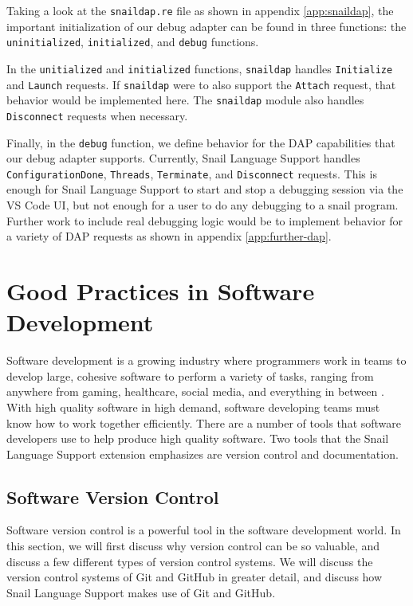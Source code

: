 \documentclass{article}
\begin{document}
Taking a look at the \lstinline{snaildap.re} file as shown in appendix \ref{app:snaildap}, the important initialization of our debug adapter can be found in three functions: the \lstinline{uninitialized}, \lstinline{initialized}, and \lstinline{debug} functions. 

In the \lstinline{unitialized} and \lstinline{initialized} functions, \lstinline{snaildap} handles \lstinline{Initialize} and \lstinline{Launch} requests. If \lstinline{snaildap} were to also support the \lstinline{Attach} request, that behavior would be implemented here. The \lstinline{snaildap} module also handles \lstinline{Disconnect} requests when necessary. 

Finally, in the \lstinline{debug} function, we define behavior for the DAP capabilities that our debug adapter supports. Currently, Snail Language Support handles \lstinline{ConfigurationDone}, \lstinline{Threads}, \lstinline{Terminate}, and \lstinline{Disconnect} requests. This is enough for Snail Language Support to start and stop a debugging session via the VS Code UI, but not enough for a user to do any debugging to a snail program. Further work to include real debugging logic would be to implement behavior for a variety of DAP requests as shown in appendix \ref{app:further-dap}. 

\section{Good Practices in Software Development}

Software development is a growing industry where programmers work in teams to develop large, cohesive software to perform a variety of tasks, ranging from anywhere from gaming, healthcare, social media, and everything in between \cite{BusinessResearchCompany_2023}. With high quality software in high demand, software developing teams must know how to work together efficiently. There are a number of tools that software developers use to help produce high quality software. Two tools that the Snail Language Support extension emphasizes are version control and documentation.

\subsection{Software Version Control}

Software version control is a powerful tool in the software development world. In this section, we will first discuss why version control can be so valuable, and discuss a few different types of version control systems. We will discuss the version control systems of Git and GitHub in greater detail, and discuss how Snail Language Support makes use of Git and GitHub.
\end{document}
